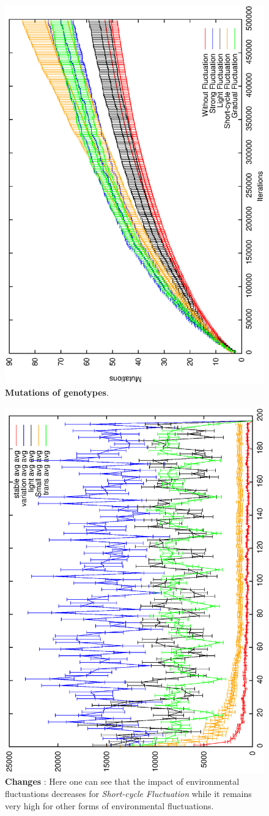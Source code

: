\documentclass[letterpaper]{article}
\begin{document}
\begin{figure}[h]
\centering
\includegraphics[width=0.7\columnwidth, angle =-90 ]{Mutations}
\caption{\textbf{Mutations of genotypes}.
}
\label{Mutations}
\end{figure}

\begin{figure}[h]
\centering
\includegraphics[width=0.7\columnwidth, angle =-90 ]{cumuldiff}
\caption{\textbf{Changes} : Here one can see that the impact of environmental fluctuations decreases for \emph{Short-cycle  Fluctuation} while it remains very high for other forms of environmental fluctuations.
}
\label{Mutations}
\end{figure}
\end{document}
